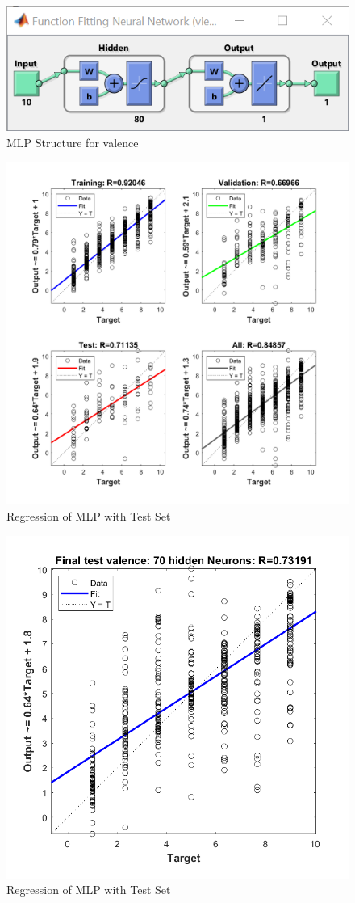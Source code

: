 \begin{figure}[H]
	\centering
	\includegraphics{img/valence_mlp_80.png} 
	\caption{MLP Structure for valence}
\end{figure}

\begin{figure}[H]
	\centering
	\includegraphics[width=\linewidth]{img/valence_mlp_80_regression.png} 
	\caption{Regression of MLP with Test Set}
\end{figure}
\begin{figure}[H]
	\centering
	\includegraphics[width=0.6\linewidth]{img/valence_mlp_80_regression_with_testset.png} 
	\caption{Regression of MLP with Test Set}
\end{figure}

